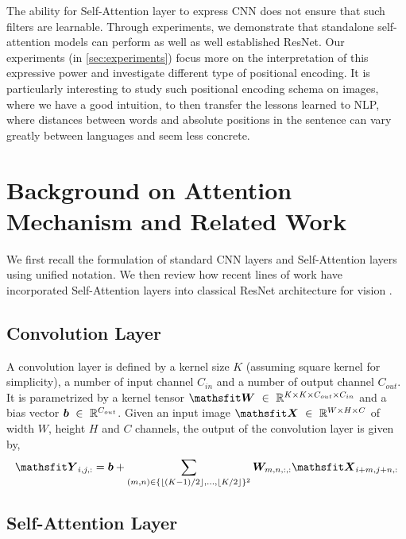 \documentclass{article} %
\begin{document}
The ability for Self-Attention layer to express CNN does not ensure that such filters are learnable.
%
Through experiments, we demonstrate that standalone self-attention models can perform as well as well established ResNet.
%
Our experiments (in \cref{sec:experiments}) focus more on the interpretation of this expressive power and investigate different type of positional encoding.
%
It is particularly interesting to study such positional encoding schema on images, where we have a good intuition, to then transfer the lessons learned to NLP, where distances between words and absolute positions in the sentence can vary greatly between languages and seem less concrete.
%

\section{Background on Attention Mechanism and Related Work}
\label{sec:background}

We first recall the formulation of standard CNN layers and Self-Attention layers using unified notation.
We then review how recent lines of work have incorporated Self-Attention layers into classical ResNet architecture for vision \citep{ramachandran2019standaloneselfattention,belloAttentionAugmentedConvolutional2019}.


\subsection{Convolution Layer}

A convolution layer is defined by a kernel size $K$ (assuming square kernel for simplicity), a number of input channel $C_{in}$ and a number of output channel $C_{out}$. 
It is parametrized by a kernel tensor $\tW~\in~\R^{K\times K \times C_{out} \times C_{in}}$ and a bias vector ${\bm{b}}~\in~\mathbb{R}^{C_{out}}$.
Given an input image $\tX~\in~\R^{W\times H \times C}$ of width $W$, height $H$ and $C$ channels, 
the output of the convolution layer is given by,
%
\begin{align}
  \tY_{i,j,:} = 
  \vb 
  +
  \sum_{(m, n) \in \{\lfloor (K-1) / 2 \rfloor, \dots, \lfloor K / 2 \rfloor\}^2}
  \mW_{m,n,:,:}
  \tX_{i+m, j+n, :}
\end{align}
%


\subsection{Self-Attention Layer}
\end{document}
